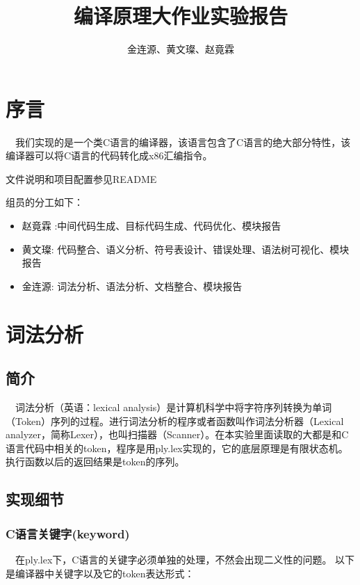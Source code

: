 \documentclass{article}
\title{编译原理大作业实验报告}
\author{金连源、黄文璨、赵竟霖}
\begin{document}
	

\newpage
\tableofcontents
\newpage


\section{序言}

\quad \ \  我们实现的是一个类C语言的编译器，该语言包含了C语言的绝大部分特性，该编译器可以将C语言的代码转化成x86汇编指令。


文件说明和项目配置参见README


组员的分工如下：
\begin{itemize}
\item 赵竟霖 :中间代码生成、目标代码生成、代码优化、模块报告
\item 黄文璨: 代码整合、语义分析、符号表设计、错误处理、语法树可视化、模块报告
\item 金连源: 词法分析、语法分析、文档整合、模块报告
\end{itemize}

\section{词法分析}

\subsection{简介}

\quad \ \  词法分析（英语：lexical analysis）是计算机科学中将字符序列转换为单词（Token）序列的过程。进行词法分析的程序或者函数叫作词法分析器（Lexical analyzer，简称Lexer），也叫扫描器（Scanner）。在本实验里面读取的大都是和C语言代码中相关的token，程序是用ply.lex实现的，它的底层原理是有限状态机。执行函数以后的返回结果是token的序列。

\subsection{实现细节}

\subsubsection{C语言关键字(keyword)}

\quad \ \  在ply.lex下，C语言的关键字必须单独的处理，不然会出现二义性的问题。
以下是编译器中关键字以及它的token表达形式：
\end{document}
